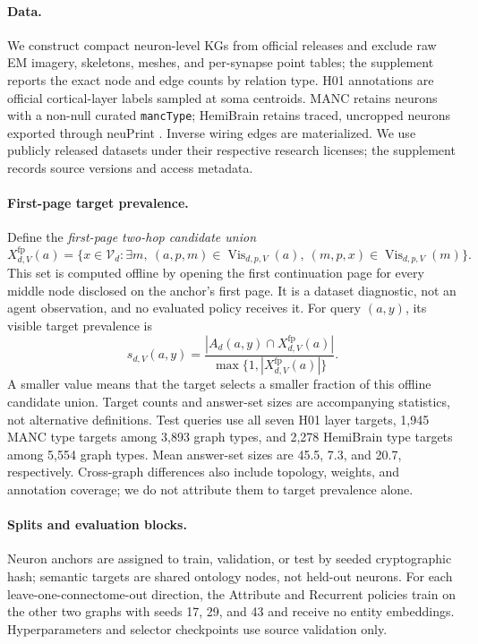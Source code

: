 \documentclass{article}
\newcommand{\Vis}{\operatorname{Vis}}
\begin{document}
\paragraph{Data.}
We construct compact neuron-level KGs from official releases and exclude raw EM
imagery, skeletons, meshes, and per-synapse point tables; the supplement reports
the exact node and edge counts by relation type.  H01 annotations are
official cortical-layer labels sampled at soma centroids.  MANC retains neurons
with a non-null curated \texttt{mancType}; HemiBrain retains traced, uncropped
neurons exported through neuPrint \citep{clements2020neuprint}.  Inverse wiring
edges are materialized.  We use publicly released datasets under their respective research licenses; the
supplement records source versions and access metadata.


\paragraph{First-page target prevalence.}
Define the \emph{first-page two-hop candidate union}
\[
 X^{\mathrm{fp}}_{d,V}(a)=\{x\in\mathcal V_d:\exists m,\
 (a,p,m)\in\Vis_{d,p,V}(a),\
 (m,p,x)\in\Vis_{d,p,V}(m)\}.
\]
This set is computed offline by opening the first continuation page for every
middle node disclosed on the anchor's first page. It is a dataset diagnostic,
not an agent observation, and no evaluated policy receives it. For query
$(a,y)$, its visible target prevalence is
\[
 s_{d,V}(a,y)=
 \frac{|A_d(a,y)\cap X^{\mathrm{fp}}_{d,V}(a)|}
 {\max\{1,|X^{\mathrm{fp}}_{d,V}(a)|\}}.
\]
A smaller value means that the target selects a smaller fraction of this
offline candidate union. Target counts and answer-set sizes are accompanying
statistics, not alternative definitions. Test queries use all seven H01 layer
targets, 1,945 MANC type targets among 3,893 graph types, and 2,278 HemiBrain
type targets among 5,554 graph types. Mean answer-set sizes are 45.5, 7.3, and
20.7, respectively. Cross-graph differences also include topology, weights,
and annotation coverage; we do not attribute them to target prevalence alone.




\paragraph{Splits and evaluation blocks.}
Neuron anchors are assigned to train, validation, or test by seeded cryptographic
hash; semantic targets are shared ontology nodes, not held-out neurons. For each
leave-one-connectome-out direction, the Attribute and Recurrent policies
train on the other two graphs with seeds 17, 29, and 43 and receive no entity
embeddings. Hyperparameters and selector checkpoints use source validation only.
\end{document}
